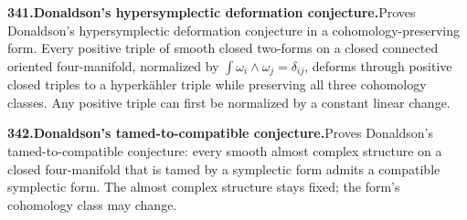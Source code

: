 \documentclass[11pt,a4paper]{article}
\begin{document}
  \par \begin{minipage}{\linewidth}
  \fontsize{10.5}{12.6}\selectfont\RaggedRight
  \hypertarget{result 341}{}
  {\bfseries\textcolor{muted}{341.}\enspace Donaldson's hypersymplectic deformation conjecture.}\enspace Proves Donaldson's hypersymplectic deformation conjecture in a cohomology-preserving form. Every positive triple of smooth closed two-forms on a closed connected oriented four-manifold, normalized by $\int\omega_i\wedge\omega_j=\delta_{ij}$, deforms through positive closed triples to a hyperk\"ahler triple while preserving all three cohomology classes. Any positive triple can first be normalized by a constant linear change.\par
  \end{minipage}\par\vspace{5pt}



  \par \begin{minipage}{\linewidth}
  \fontsize{10.5}{12.6}\selectfont\RaggedRight
  \hypertarget{result 342}{}
  {\bfseries\textcolor{muted}{342.}\enspace Donaldson's tamed-to-compatible conjecture.}\enspace Proves Donaldson's tamed-to-compatible conjecture: every smooth almost complex structure on a closed four-manifold that is tamed by a symplectic form admits a compatible symplectic form. The almost complex structure stays fixed; the form's cohomology class may change.\par
  \end{minipage}\par\vspace{5pt}
\end{document}
